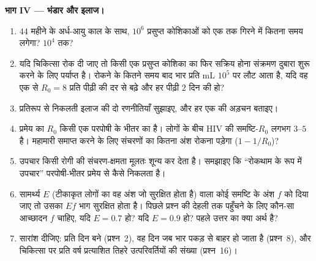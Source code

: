 \begin{problem}
\medskip
\noindent\textbf{भाग IV --- भंडार और इलाज।}
\begin{enumerate}[resume]
  \item $44$ महीने के अर्ध-आयु काल के साथ, $10^{6}$
        प्रसुप्त कोशिकाओं को एक तक गिरने में कितना समय लगेगा? $10^{4}$
        तक?
  \item यदि चिकित्सा रोक दी जाए तो किसी एक प्रसुप्त कोशिका का फिर
        सक्रिय होना संक्रमण दुबारा शुरू करने के लिए पर्याप्त है। रोकने
        के कितने समय बाद भार प्रति mL $10^{5}$ पर लौट आता है, यदि वह
        एक  से $R_{0} = 8$ प्रति पीढ़ी की दर से बढ़े और हर
        पीढ़ी $2$ दिन की हो?
  \item प्रतिरूप से निकलती इलाज की दो रणनीतियाँ सुझाइए, और हर एक की
        अड़चन बताइए।
  \item प्रमेय का $R_{0}$ किसी एक परपोषी के भीतर का है। लोगों के बीच
        HIV की समष्टि-$R_{0}$ लगभग $3$--$5$ है। महामारी समाप्त करने के
        लिए संचरणों का कितना अंश रोकना पड़ेगा
        ($1 - 1/R_{0}$)?
  \item उपचार किसी रोगी की संचरण-क्षमता मूलतः शून्य कर देता है।
        समझाइए कि ``रोकथाम के रूप में उपचार'' परपोषी-भीतर प्रमेय से
        कैसे निकलता है।
  \item सामर्थ्य $E$ (टीकाकृत लोगों का वह अंश जो सुरक्षित होता है) वाला
        कोई  समष्टि के अंश $f$ को दिया जाए तो उसका $Ef$ भाग
        सुरक्षित होता है। पिछले प्रश्न की देहली तक पहुँचने के लिए
        कौन-सा आच्छादन $f$ चाहिए, यदि $E = 0.7$ हो? यदि
        $E = 0.9$ हो? पहले उत्तर का क्या अर्थ है?
  \item सारांश दीजिए: प्रति दिन बने  (प्रश्न~2), वह दिन जब भार
        पकड़ से बाहर हो जाता है (प्रश्न~8), और चिकित्सा पर प्रति वर्ष
        प्रत्याशित तिहरे उत्परिवर्तियों की संख्या (प्रश्न~16)।
\end{enumerate}
\end{problem}
